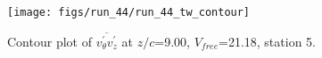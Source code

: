 \begin{figure}[H]
\centering
\texttt{[image: figs/run\_44/run\_44\_tw\_contour]}
\caption{Contour plot of $\overline{v_{\theta}^{\prime} v_{z}^{\prime}}$ at $z/c$=9.00, $V_{free}$=21.18, station 5.}
\label{fig:run_44_tw_contour}
\end{figure}


